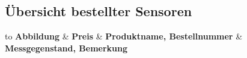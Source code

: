 \subsection{Übersicht bestellter Sensoren}

\begin{longtabu} to 
	\hline
	\textbf{Abbildung}			& \textbf{Preis}		& \textbf{Produktname, Bestellnummer}		& \textbf{Messgegenstand, Bemerkung} \\
	\hline
	\endhead

	  \\
	\endfoot
	\endlastfoot


\end{longtabu}
